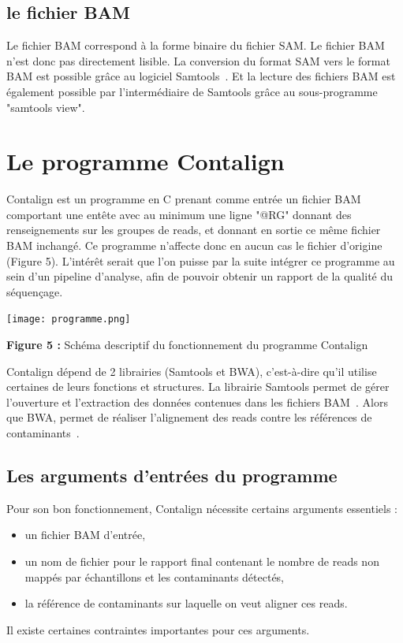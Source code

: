 \documentclass[a4paper,12pt]{article}
\begin{document}
\subsection{le fichier BAM}
Le fichier BAM correspond à la forme binaire du fichier SAM. Le fichier BAM n'est donc pas directement lisible. La conversion du format SAM vers le format BAM est possible grâce au logiciel Samtools~\cite{SAM2}. Et la lecture des fichiers BAM est également possible par l'intermédiaire de Samtools grâce au sous-programme "samtools view". 
 \\
\section{Le programme Contalign}
Contalign est un programme en C prenant comme entrée un fichier BAM comportant une entête avec au minimum une ligne "@RG" donnant des renseignements sur les groupes de reads, et donnant en sortie ce même fichier BAM inchangé. Ce programme n'affecte donc en aucun cas le fichier d'origine (Figure 5). L'intérêt serait que l'on puisse par la suite intégrer ce programme au sein d'un pipeline d'analyse, afin de pouvoir obtenir un rapport de la qualité du séquençage. 
 
\begin{center}
\texttt{[image: programme.png]}~
\end{center}
\begin{center}
\textbf{ Figure 5 : }Schéma descriptif du fonctionnement du programme Contalign
\end{center}
Contalign dépend de 2 librairies (Samtools et BWA), c'est-à-dire qu'il utilise certaines de leurs fonctions et structures. La librairie Samtools permet de gérer l'ouverture et l'extraction des données contenues dans les fichiers BAM~\cite{SAM}. Alors que BWA, permet de réaliser l'alignement des reads contre les références de contaminants~\cite{BWA}. 
\\
\subsection{Les arguments d'entrées du programme}

Pour son bon fonctionnement, Contalign nécessite certains arguments essentiels : 
\begin{itemize}
\item un fichier BAM d'entrée, 
\item un nom de fichier pour le rapport final contenant le nombre de reads non mappés par échantillons et les contaminants détectés, 
\item la référence de contaminants sur laquelle on veut aligner ces reads.
\end{itemize}
Il existe certaines contraintes importantes pour ces arguments. \\
\end{document}
